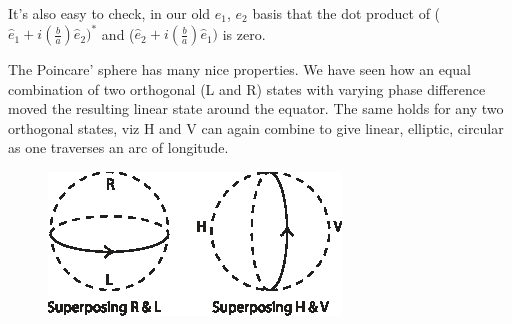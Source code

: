 It's also easy to check, in our old $e_1$, $e_2$ basis that the dot product of ($\hat{e}_1 + i (\frac{b}{a}) \hat{e}_2)^{\ast}$ and ($\hat{e}_2 + i(\frac{b}{a}) \hat{e}_1)$ is zero.

The Poincare' sphere has many nice properties. We have seen how an equal
combination of two orthogonal (L and R) states with varying phase difference
moved the resulting linear state around the equator. The same holds for any
two orthogonal states, viz H and V can again combine to give linear, elliptic,
circular as one traverses an arc of longitude.
\bigskip

\begin{figure}[H]
\centering
\includegraphics[scale=1.2]{src/images/chap26/9.jpg}
\end{figure}
\bigskip

